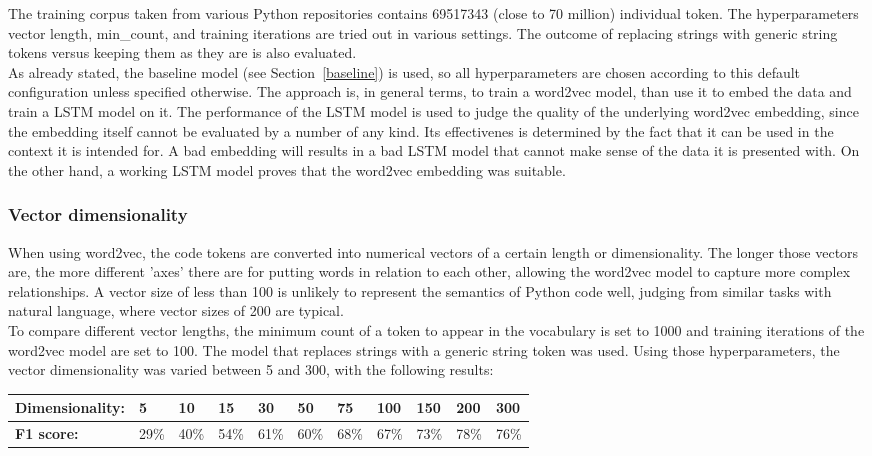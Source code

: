 \documentclass[
a4paper,
pagesize,
pdftex,
12pt,
twoside, %
BCOR=5mm, %
ngerman,
fleqn,
final,
]{scrartcl}
\begin{document}
	The training corpus taken from various Python repositories contains 69517343 (close to 70 million) individual token. The hyperparameters vector length, min\_count, and training iterations are tried out in various settings. The outcome of replacing strings with generic string tokens versus keeping them as they are is also evaluated.\\
	As already stated, the baseline model (see Section~\ref{baseline}) is used, so all hyperparameters are chosen according to this default configuration unless specified otherwise. The approach is, in general terms, to train a word2vec model, than use it to embed the data and train a LSTM model on it. The performance of the LSTM model is used to judge the quality of the underlying word2vec embedding, since the embedding itself cannot be evaluated by a number of any kind. Its effectivenes is determined by the fact that it can be used in the context it is intended for. A bad embedding will results in a bad LSTM model that cannot make sense of the data it is presented with. On the other hand, a working LSTM model proves that the word2vec embedding was suitable.
	
	\subsubsection{Vector dimensionality}
	When using word2vec, the code tokens are converted into numerical vectors of a certain length or dimensionality. The longer those vectors are, the more different 'axes' there are for putting words in relation to each other, allowing the word2vec model to capture more complex relationships. A vector size of less than 100 is unlikely to represent the semantics of Python code well, judging from similar tasks with natural language, where vector sizes of 200 are typical.\\
	To compare different vector lengths, the minimum count of a token to appear in the vocabulary is set to 1000 and training iterations of the word2vec model are set to 100. The model that replaces strings with a generic string token was used. Using those hyperparameters, the vector dimensionality was varied between 5 and 300, with the following results:	
	
	\begin{tabular}{| p{3.5cm}  | p{0.6cm} | p{0.6cm} | p{0.6cm} | p{0.6cm} | p{0.6cm} | p{0.6cm} | p{0.8cm} | p{0.8cm} | p{0.8cm} | p{0.8cm} | }
		\hline
		\textbf{Dimensionality:} & 5 & 10 & 15 & 30 & 50 & 75 & 100 & 150 & 200 & 300 \\
		\hline
		
		\textbf{F1 score:} & 29\% & 40\% & 54\% & 61\% & 60\% & 68\% & 67\% & 73\% & 78\% & 76\% \\
		\hline
		\hline
	\end{tabular}
	
\end{document}
